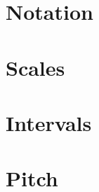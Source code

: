 \documentclass{book}
\begin{document}
    \chapter{Notation}
    
    \chapter{Scales}
    
    \chapter{Intervals}
    
    \chapter{Pitch}
    
\end{document}
